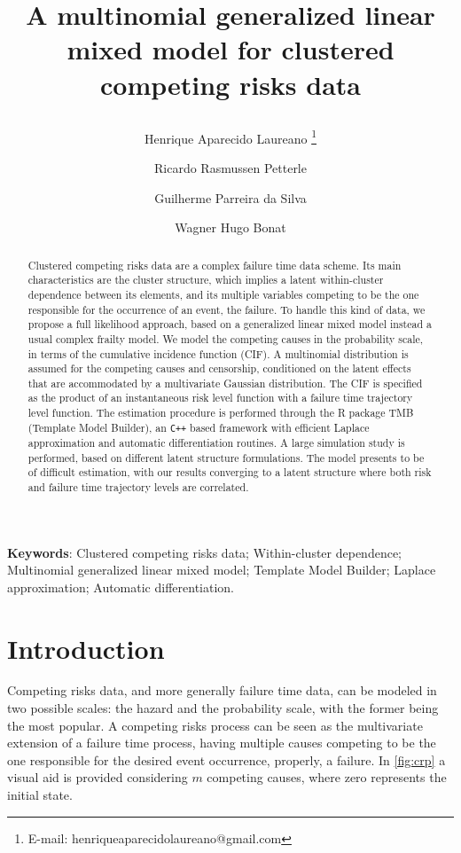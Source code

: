 \documentclass[a4paper,12pt]{article}
\title{
  
  A multinomial generalized linear mixed model for clustered competing
  risks data

}
\author[1]{Henrique Aparecido Laureano
  \footnote{E-mail: henriqueaparecidolaureano@gmail.com}
}
\author[2]{Ricardo Rasmussen Petterle}
\author[3]{Guilherme Parreira da Silva}
\author[4]{Wagner Hugo Bonat}
\affil[1]{
  Instituto de Pesquisa Pel\'{e} Pequeno Pr\'{i}ncipe,
  Curitiba, Brasil
}
\affil[2]{
  Departamento de Medicina Integrada,
  Universidade Federal do Paran\'{a}, Curitiba, Brasil
}
\affil[3,4]{
  Laborat\'{o}rio de Estat\'{i}stica e Geoinforma\c{c}\~{a}o,
  Departamento de Estat\'{i}stica,
  Universidade Federal do Paran\'{a}, Curitiba, Brasil
}
\begin{document}
\maketitle

\begin{abstract}

  Clustered competing risks data are a complex failure time data
  scheme. Its main characteristics are the cluster structure, which
  implies a latent within-cluster dependence between its elements, and
  its multiple variables competing to be the one responsible for the
  occurrence of an event, the failure. To handle this kind of data, we
  propose a full likelihood approach, based on a generalized linear
  mixed model instead a usual complex frailty model. We model the
  competing causes in the probability scale, in terms of the cumulative
  incidence function (CIF). A multinomial distribution is assumed for
  the competing causes and censorship, conditioned on the latent effects
  that are accommodated by a multivariate Gaussian distribution. The CIF
  is specified as the product of an instantaneous risk level function
  with a failure time trajectory level function. The estimation
  procedure is performed through the R package TMB (Template Model
  Builder), an \texttt{C++} based framework with efficient Laplace
  approximation and automatic differentiation routines. A large
  simulation study is performed, based on different latent structure
  formulations. The model presents to be of difficult estimation, with
  our results converging to a latent structure where both risk and
  failure time trajectory levels are correlated.

\end{abstract}
\vfill
\noindent\textbf{Keywords}: 
Clustered competing risks data;
Within-cluster dependence;
Multinomial generalized linear mixed model;
Template Model Builder;
Laplace approximation;
Automatic differentiation.
\vspace{0.2cm}
\newpage

\section{Introduction}

Competing risks data, and more generally failure time data, can be
modeled in two possible scales: the hazard and the probability scale,
with the former being the most popular. A competing risks process can be
seen as the multivariate extension of a failure time process, having
multiple causes competing to be the one responsible for the desired
event occurrence, properly, a failure. In \autoref{fig:crp} a visual aid
is provided considering \(m\) competing causes, where zero represents
the initial state.
\end{document}
